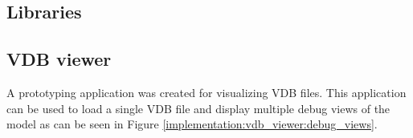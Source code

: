 \begin{figure}[H]
    \centering

    \caption{} \label{implementation:compression}
\end{figure}

\subsection{Libraries} \label{implementation:libraries}



\subsection{VDB viewer} \label{implementation:vdb_viewer}
A prototyping application was created for visualizing VDB files. This application can be used to load a single VDB file and display multiple debug views of the model as can be seen in Figure \ref{implementation:vdb_viewer:debug_views}.

